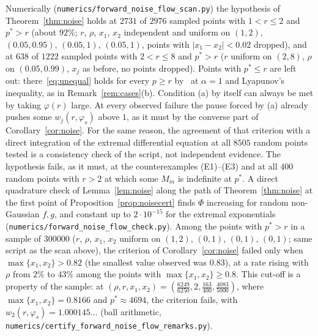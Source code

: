 \documentclass[11pt]{amsart}
\theoremstyle{definition}
\begin{document}
Numerically (\texttt{numerics/forward\_noise\_flow\_scan.py}) the hypothesis of Theorem~\ref{thm:noise} holds at
$2731$ of $2976$ sampled points with $1<r\le2$ and $p^*>r$ (about $92\%$; $r$, $\rho$, $x_1$, $x_2$ independent and
uniform on $(1,2)$, $(0.05,0.95)$, $(0.05,1)$, $(0.05,1)$, points with $|x_1-x_2|<0.02$ dropped), and at $638$ of $1222$
sampled points with $2<r\le8$ and $p^*>r$ ($r$ uniform on $(2,8)$, $\rho$ on $(0.05,0.99)$, $x_j$ as before, no points
dropped). Points with $p^*\le r$ are left out: there~\eqref{eq:unequal} holds for every $p\ge r$
by~\cite[Thm.~9(i)]{IK25} at $\alpha=1$ and Lyapunov's inequality, as in Remark~\ref{rem:cases}(b). Condition (a) by
itself can always be met by taking $\varphi(r)$ large. At every observed failure the pause forced by (a) already pushes
some $w_j(r,\varphi_s)$ above $1$, as it must by the converse part of Corollary~\ref{cor:noise}. For the same reason,
the agreement of that criterion with a direct integration of the extremal differential equation at all $8505$ random
points tested is a consistency check of the script, not independent evidence. The hypothesis fails, as it must, at
the counterexamples (E1)--(E3) and at all $400$ random points with $r>2$ at which some $M_m$ is indefinite at $p^*$. A
direct quadrature check of Lemma~\ref{lem:noise} along the path of Theorem~\ref{thm:noise} at the first point of
Proposition~\ref{prop:noisecert} finds $\Phi$ increasing for random non-Gaussian $f,g$, and constant up to
$2\cdot10^{-15}$ for the extremal exponentials (\texttt{numerics/forward\_noise\_flow\_check.py}). Among the points with $p^*>r$ in a
sample of $300000$ ($r$, $\rho$, $x_1$, $x_2$ uniform on $(1,2)$, $(0,1)$, $(0,1)$, $(0,1)$; same script as the scan
above), the criterion of Corollary~\ref{cor:noise} failed only when $\max\{x_1,x_2\}>0.82$ (the smallest value
observed was $0.83$), at a rate rising with $\rho$ from $2\%$ to $43\%$ among the points with
$\max\{x_1,x_2\}\ge0.8$. This cut-off is a property of the sample: at
$(\rho,r,x_1,x_2)=(\frac{6249}{6250},2,\frac{163}{400},\frac{4083}{5000})$, where $\max\{x_1,x_2\}=0.8166$ and
$p^*\approx4694$, the criterion fails, with $w_2(r,\varphi_s)=1.000145\ldots$ (ball arithmetic,
\texttt{numerics/certify\_forward\_noise\_flow\_remarks.py}).
\end{document}
